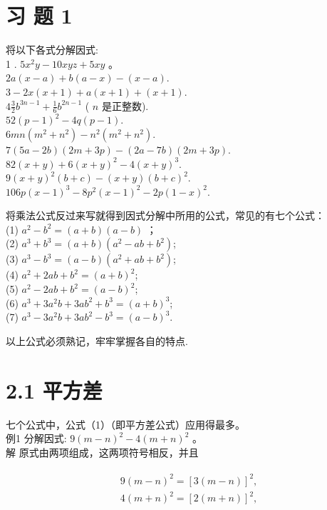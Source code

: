 \documentclass[10pt]{article}
\begin{document}
\section*{习 题 1}
将以下各式分解因式:\\
1 . $5 x^{2} y-10 x y z+5 x y$ 。\\
$2 a(x-a)+b(a-x)-(x-a)$.\\
$3-2 x(x+1)+a(x+1)+(x+1)$.\\
$4 \frac{3}{2} b^{3 n-1}+\frac{1}{6} b^{2 n-1}$ ( $n$ 是正整数).\\
$52(p-1)^{2}-4 q(p-1)$.\\
$6 m n\left(m^{2}+n^{2}\right)-n^{2}\left(m^{2}+n^{2}\right)$.\\
$7(5 a-2 b)(2 m+3 p)-(2 a-7 b)(2 m+3 p)$.\\
$82(x+y)+6(x+y)^{2}-4(x+y)^{3}$.\\
$9(x+y)^{2}(b+c)-(x+y)(b+c)^{2}$.\\
$106 p(x-1)^{3}-8 p^{2}(x-1)^{2}-2 p(1-x)^{2}$.

将乘法公式反过来写就得到因式分解中所用的公式，常见的有七个公式：\\
(1) $a^{2}-b^{2}=(a+b)(a-b)$ ；\\
(2) $a^{3}+b^{3}=(a+b)\left(a^{2}-a b+b^{2}\right)$;\\
(3) $a^{3}-b^{3}=(a-b)\left(a^{2}+a b+b^{2}\right)$;\\
(4) $a^{2}+2 a b+b^{2}=(a+b)^{2}$;\\
(5) $a^{2}-2 a b+b^{2}=(a-b)^{2}$;\\
(6) $a^{3}+3 a^{2} b+3 a b^{2}+b^{3}=(a+b)^{3}$;\\
(7) $a^{3}-3 a^{2} b+3 a b^{2}-b^{3}=(a-b)^{3}$.

以上公式必须熟记，牢牢掌握各自的特点.

\section*{2.1 平方差}
七个公式中，公式（1）（即平方差公式）应用得最多。\\
例1 分解因式: $9(m-n)^{2}-4(m+n)^{2}$ 。\\
解 原式由两项组成，这两项符号相反，并且

\begin{align*}
\begin{aligned}
& 9(m-n)^{2}=[3(m-n)]^{2}, \\
& 4(m+n)^{2}=[2(m+n)]^{2},
\end{aligned}
\end{align*}
\end{document}

